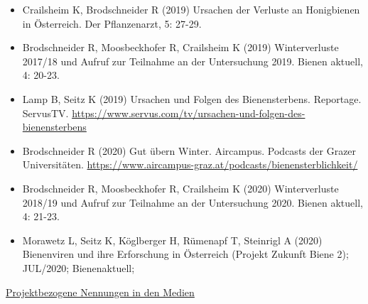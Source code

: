 \begin{itemize}

    \item
    Crailsheim K, Brodschneider R (2019) Ursachen der Verluste an Honigbienen in Österreich. Der Pflanzenarzt, 5: 27-29.

    \item
    Brodschneider R, Moosbeckhofer R, Crailsheim K (2019) Winterverluste 2017/18 und Aufruf zur Teilnahme an der Untersuchung 2019. Bienen aktuell, 4: 20-23.

    \item
    Lamp B, Seitz K (2019) Ursachen und Folgen des Bienensterbens. Reportage. ServusTV. \url{https://www.servus.com/tv/ursachen-und-folgen-des-bienensterbens}
    
    \item
    Brodschneider R (2020) Gut übern Winter. Aircampus. Podcasts der Grazer Universitäten. \url{https://www.aircampus-graz.at/podcasts/bienensterblichkeit/}
    
    \item
    Brodschneider R, Moosbeckhofer R, Crailsheim K (2020) Winterverluste 2018/19 und Aufruf zur Teilnahme an der Untersuchung 2020. Bienen aktuell, 4: 21-23.
    
    \item
    Morawetz L, Seitz K, Köglberger H, Rümenapf T, Steinrigl A (2020) Bienenviren und ihre Erforschung in Österreich (Projekt Zukunft Biene 2); JUL/2020; Bienenaktuell; 

\end{itemize}

\underline{Projektbezogene Nennungen in den Medien}

